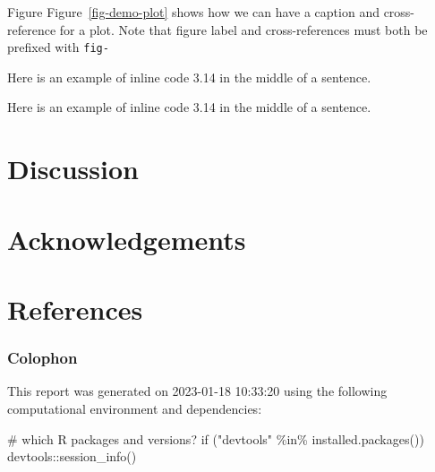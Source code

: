 \documentclass[
  super,
  preprint,
  3p]{elsarticle}
\newenvironment{Shaded}{\begin{snugshade}}{\end{snugshade}}
\newcommand{\CommentTok}[1]{\textcolor[rgb]{0.37,0.37,0.37}{#1}}
\newcommand{\ControlFlowTok}[1]{\textcolor[rgb]{0.00,0.23,0.31}{#1}}
\newcommand{\FunctionTok}[1]{\textcolor[rgb]{0.28,0.35,0.67}{#1}}
\newcommand{\NormalTok}[1]{\textcolor[rgb]{0.00,0.23,0.31}{#1}}
\newcommand{\SpecialCharTok}[1]{\textcolor[rgb]{0.37,0.37,0.37}{#1}}
\newcommand{\StringTok}[1]{\textcolor[rgb]{0.13,0.47,0.30}{#1}}
\newlength{\cslhangindent}
\newlength{\cslentryspacingunit} %
\newenvironment{CSLReferences}[2] %
 {%
  \setlength{\parindent}{0pt}
  \ifodd #1
  \let\oldpar\par
  \def\par{\hangindent=\cslhangindent\oldpar}
  \fi
  \setlength{\parskip}{#2\cslentryspacingunit}
 }%
 {}
\begin{document}
Figure Figure~\ref{fig-demo-plot} shows how we can have a caption and
cross-reference for a plot. Note that figure label and cross-references
must both be prefixed with \texttt{fig-}

Here is an example of inline code 3.14 in the middle of a sentence.

Here is an example of inline code 3.14 in the middle of a sentence.

\hypertarget{discussion-1}{%
\section{Discussion}\label{discussion-1}}

\hypertarget{acknowledgements}{%
\section{Acknowledgements}\label{acknowledgements}}

\hypertarget{references}{%
\section{References}\label{references}}

\hypertarget{refs}{}
\begin{CSLReferences}{0}{0}
\end{CSLReferences}

\newpage

\hypertarget{refs}{}
\begin{CSLReferences}{0}{0}
\end{CSLReferences}

\hypertarget{colophon}{%
\subsubsection{Colophon}\label{colophon}}

This report was generated on 2023-01-18 10:33:20 using the following
computational environment and dependencies:

\begin{Shaded}
\begin{Highlighting}[]
\CommentTok{\# which R packages and versions?}
\ControlFlowTok{if}\NormalTok{ (}\StringTok{"devtools"} \SpecialCharTok{\%in\%} \FunctionTok{installed.packages}\NormalTok{()) devtools}\SpecialCharTok{::}\FunctionTok{session\_info}\NormalTok{()}
\end{Highlighting}
\end{Shaded}
\end{document}
